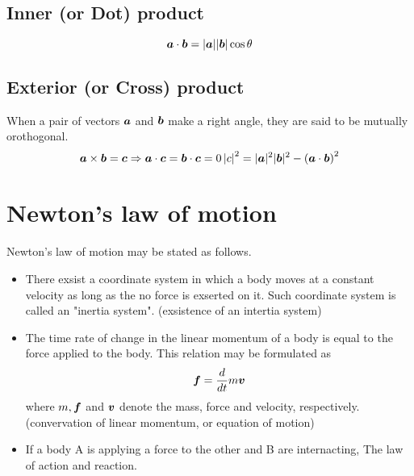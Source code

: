 \documentclass[10pt,a4j]{jarticle}
\begin{document}
\subsection{Inner (or Dot) product} 
\[
	\mbox{\boldmath $a$}\cdot\mbox{\boldmath $b$}=|\mbox{\boldmath $a$}||\mbox{\boldmath $b$}|\cos\theta
\]
\subsection{Exterior (or Cross) product} 
When a pair of vectors $\mbox{\boldmath $a$}$ and $\mbox{\boldmath $b$}$ make a right 
angle, they are said to be mutually orothogonal.  
\[
	\mbox{\boldmath $a$}\times \mbox{\boldmath $b$}= \mbox{\boldmath $c$}
	\Rightarrow
	\mbox{\boldmath $a$}\cdot\mbox{\boldmath $c$}=\mbox{\boldmath $b$}\cdot\mbox{\boldmath $c$}=0
	\left|c\right|^2=|\mbox{\boldmath $a$}|^2|\mbox{\boldmath $b$}|^2-\left(\mbox{\boldmath $a$}\cdot\mbox{\boldmath $b$}\right)^2
\]
\section{Newton's law of motion}
Newton's law of motion may be stated as follows.
\begin{itemize}
\item 
	There exsist a coordinate system in which a body moves at a constant velocity as long as the 
	no force is exserted on it. Such coordinate system is called an "inertia system".
		(exsistence of an intertia system)
\item
	The time rate of change in the linear momentum of a body is equal to the force applied to the body. 
	This relation may be formulated as 
	\[
		\mbox{\boldmath $f$}=\frac{d}{dt}m\mbox{\boldmath $v$}
	\]
		where $m, \mbox{\boldmath $f$}$ and $\mbox{\boldmath $v$}$ denote the mass, force and velocity, respectively. 
	(convervation of linear momentum, or equation of motion)
\item
	If a body A is applying a force to the other and B are internacting, 
	The law of action and reaction.
\end{itemize}
\end{document}

